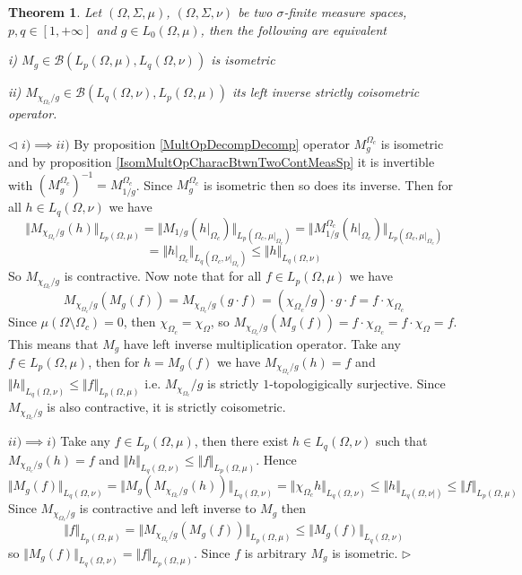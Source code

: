 \documentclass[12pt]{article}
\newtheorem{theorem}{Theorem}[subsection]
\newenvironment{proof}{\par $\triangleleft$}{$\triangleright$}
\begin{document}
\begin{theorem}\label{IsomMultOpDescBtwnTwoMeasSp} Let $(\Omega,\Sigma,\mu)$, $(\Omega,\Sigma,\nu)$ be two $\sigma$-finite measure spaces, $p,q\in[1,+\infty]$ and $g\in L_0(\Omega,\mu)$, then the following are equivalent

i) $M_g\in\mathcal{B}(L_p(\Omega,\mu),L_q(\Omega,\nu))$ is isometric

ii) $M_{\chi_{\Omega_c}/g}\in\mathcal{B}(L_q(\Omega,\nu), L_p(\Omega,\mu))$ its left inverse strictly coisometric operator.
\end{theorem}
\begin{proof}
$i)\implies ii)$ By proposition \ref{MultOpDecompDecomp} operator $M_g^{\Omega_c}$ is isometric and by proposition \ref{IsomMultOpCharacBtwnTwoContMeasSp} it is invertible with $(M_g^{\Omega_c})^{-1}=M_{1/g}^{\Omega_c}$. Since $M_g^{\Omega_c}$ is isometric then so does its inverse. Then for all $h\in L_q(\Omega,\nu)$ we have
$$
\Vert M_{\chi_{\Omega_c}/g}(h)\Vert_{L_p(\Omega,\mu)}=
\Vert M_{1/g}(h|_{\Omega_c})\Vert_{L_p(\Omega_c,\mu|_{\Omega_c})}=
\Vert M_{1/g}^{\Omega_c}(h|_{\Omega_c})\Vert_{L_p(\Omega_c,\mu|_{\Omega_c})}
$$
$$
=\Vert h|_{\Omega_c}\Vert_{L_q(\Omega_c,\nu|_{\Omega_c})}
\leq \Vert h \Vert_{L_q(\Omega,\nu)}
$$
So $M_{\chi_{\Omega_c}/g}$ is contractive. Now note that for all $f\in L_p(\Omega,\mu)$ we have
$$
M_{\chi_{\Omega_c}/g}(M_g(f))
=M_{\chi_{\Omega_c}/g}(g\cdot f)
=(\chi_{\Omega_c}/g)\cdot g\cdot f
=f\cdot\chi_{\Omega_c}
$$
Since $\mu(\Omega\setminus\Omega_c)=0$, then $\chi_{\Omega_c}=\chi_{\Omega}$, so $M_{\chi_{\Omega_c}/g}(M_g(f))=f\cdot\chi_{\Omega_c}=f\cdot\chi_{\Omega}=f$. This means that $M_g$ have left inverse multiplication operator. Take any $f\in L_p(\Omega,\mu)$, then for $h=M_g(f)$ we have $M_{\chi_{\Omega_c}/g}(h)=f$ and $\Vert h\Vert_{L_q(\Omega,\nu)}\leq\Vert f\Vert_{L_p(\Omega,\mu)}$ i.e.  $M_{\chi_{\Omega_c}}/g$ is strictly $1$-topologigically surjective. Since $M_{\chi_{\Omega_c}/g}$ is also contractive, it is strictly coisometric.

$ii)\implies i)$ Take any $f\in L_p(\Omega,\mu)$, then there exist $h\in L_q(\Omega,\nu)$ such that $M_{\chi_{\Omega_c}/g}(h)=f$ and $\Vert h\Vert_{L_q(\Omega,\nu)}\leq \Vert f\Vert_{L_p(\Omega,\mu)}$. Hence
$$
\Vert M_g(f)\Vert_{L_q(\Omega,\nu)}
=\Vert M_g(M_{\chi_{\Omega_c}/g}(h))\Vert_{L_q(\Omega,\nu)}
=\Vert \chi_{\Omega_c}h\Vert_{L_q(\Omega,\nu)}
\leq\Vert h\Vert_{L_q(\Omega,\nu|)}
\leq\Vert f\Vert_{L_p(\Omega,\mu)}
$$
Since $M_{\chi_{\Omega_c}/g}$ is contractive and left inverse to $M_g$ then
$$
\Vert f\Vert_{L_p(\Omega,\mu)}
=\Vert M_{\chi_{\Omega_c}/g}(M_g(f))\Vert_{L_p(\Omega,\mu)}
\leq\Vert M_g(f)\Vert_{L_q(\Omega,\nu)}
$$
so $\Vert M_g(f)\Vert_{L_q(\Omega,\nu)}=\Vert f\Vert_{L_p(\Omega,\mu)}$. Since $f$ is arbitrary $M_g$ is isometric.
\end{proof}
\end{document}

